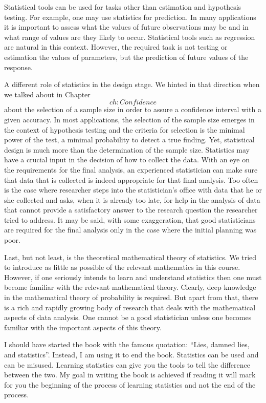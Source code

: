 \documentclass[
]{krantz}
\theoremstyle{definition}
\theoremstyle{definition}
\theoremstyle{definition}
\theoremstyle{remark}
\begin{document}
Statistical tools can be used for tasks other than estimation and
hypothesis testing. For example, one may use statistics for prediction.
In many applications it is important to assess what the values of future
observations may be and in what range of values are they likely to
occur. Statistical tools such as regression are natural in this context.
However, the required task is not testing or estimation the values of
parameters, but the prediction of future values of the response.

A different role of statistics in the design stage. We hinted in that
direction when we talked about in Chapter~\[ch:Confidence\] about the
selection of a sample size in order to assure a confidence interval with
a given accuracy. In most applications, the selection of the sample size
emerges in the context of hypothesis testing and the criteria for
selection is the minimal power of the test, a minimal probability to
detect a true finding. Yet, statistical design is much more than the
determination of the sample size. Statistics may have a crucial input in
the decision of how to collect the data. With an eye on the requirements
for the final analysis, an experienced statistician can make sure that
data that is collected is indeed appropriate for that final analysis.
Too often is the case where researcher steps into the statistician's
office with data that he or she collected and asks, when it is already
too late, for help in the analysis of data that cannot provide a
satisfactory answer to the research question the researcher tried to
address. It may be said, with some exaggeration, that good statisticians
are required for the final analysis only in the case where the initial
planning was poor.

Last, but not least, is the theoretical mathematical theory of
statistics. We tried to introduce as little as possible of the relevant
mathematics in this course. However, if one seriously intends to learn
and understand statistics then one must become familiar with the
relevant mathematical theory. Clearly, deep knowledge in the
mathematical theory of probability is required. But apart from that,
there is a rich and rapidly growing body of research that deals with the
mathematical aspects of data analysis. One cannot be a good statistician
unless one becomes familiar with the important aspects of this theory.

I should have started the book with the famous quotation: ``Lies, damned
lies, and statistics''. Instead, I am using it to end the book.
Statistics can be used and can be misused. Learning statistics can give
you the tools to tell the difference between the two. My goal in writing
the book is achieved if reading it will mark for you the beginning of
the process of learning statistics and not the end of the process.
\end{document}
